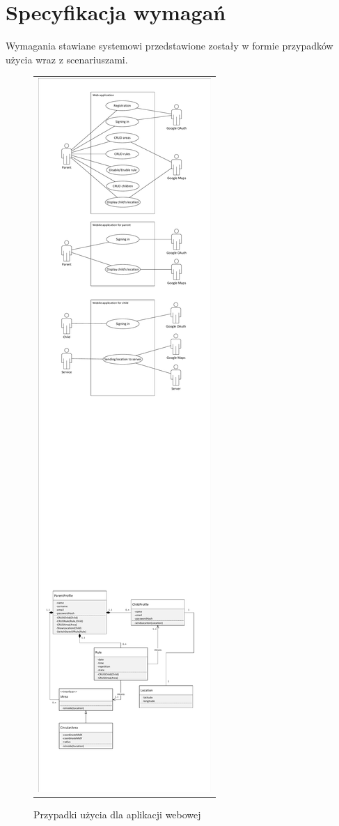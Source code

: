 \documentclass{sprawozdanie-agh}
\begin{document}
	\section{Specyfikacja wymagań}

		Wymagania stawiane systemowi przedstawione zostały w formie przypadków użycia wraz z scenariuszami.

		\begin{figure}[H]
			\centering
			\begin{tabular}{c}
				\includegraphics[width=.80\textwidth]{webUseCase} 
			\end{tabular} 
		\caption{Przypadki użycia dla aplikacji webowej}
		\end{figure}
\end{document}

